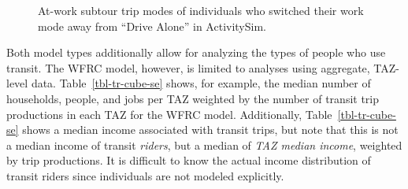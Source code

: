 \documentclass[fancy, twoside, mastersfancy, ms]{byuthesis}
\begin{document}
\begin{figure}


\caption{\label{fig-tr-atwork-switching}At-work subtour trip modes of
individuals who switched their work mode away from ``Drive Alone'' in
ActivitySim.}

\end{figure}%

Both model types additionally allow for analyzing the types of people
who use transit. The WFRC model, however, is limited to analyses using
aggregate, TAZ-level data. Table~\ref{tbl-tr-cube-se} shows, for
example, the median number of households, people, and jobs per TAZ
weighted by the number of transit trip productions in each TAZ for the
WFRC model. Additionally, Table~\ref{tbl-tr-cube-se} shows a median
income associated with transit trips, but note that this is not a median
income of transit \emph{riders}, but a median of \emph{TAZ median
income}, weighted by trip productions. It is difficult to know the
actual income distribution of transit riders since individuals are not
modeled explicitly.

\begin{table}

\caption{\label{tbl-tr-cube-se}Example Socioeconomic Analysis of Transit
Trips (WFRC Model)}


\end{table}%
\end{document}
